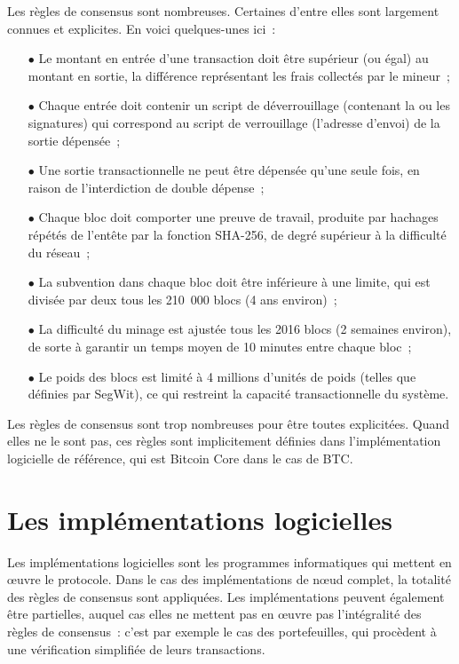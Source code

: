 Les règles de consensus sont nombreuses. Certaines d'entre elles sont largement connues et explicites. En voici quelques-unes ici~:

\begin{itemize}
\item[$\bullet$] Le montant en entrée d'une transaction doit être supérieur (ou égal) au montant en sortie, la différence représentant les frais collectés par le mineur~;
\item[$\bullet$] Chaque entrée doit contenir un script de déverrouillage (contenant la ou les signatures) qui correspond au script de verrouillage (l'adresse d'envoi) de la sortie dépensée~;
\item[$\bullet$] Une sortie transactionnelle ne peut être dépensée qu'une seule fois, en raison de l'interdiction de double dépense~;
\item[$\bullet$] Chaque bloc doit comporter une preuve de travail, produite par hachages répétés de l'entête par la fonction SHA-256, de degré supérieur à la difficulté du réseau~;
\item[$\bullet$] La subvention dans chaque bloc doit être inférieure à une limite, qui est divisée par deux tous les 210~000 blocs (4 ans environ)~;
\item[$\bullet$] La difficulté du minage est ajustée tous les 2016 blocs (2 semaines environ), de sorte à garantir un temps moyen de 10 minutes entre chaque bloc~;
\item[$\bullet$] Le poids des blocs est limité à 4 millions d'unités de poids (telles que définies par SegWit), ce qui restreint la capacité transactionnelle du système.
\end{itemize}

Les règles de consensus sont trop nombreuses pour être toutes explicitées. Quand elles ne le sont pas, ces règles sont implicitement définies dans l'implémentation logicielle de référence, qui est Bitcoin Core dans le cas de BTC.

\section*{Les implémentations logicielles}


Les implémentations logicielles sont les programmes informatiques qui mettent en œuvre le protocole. Dans le cas des implémentations de nœud complet, la totalité des règles de consensus sont appliquées. Les implémentations peuvent également être partielles, auquel cas elles ne mettent pas en œuvre pas l'intégralité des règles de consensus~: c'est par exemple le cas des portefeuilles, qui procèdent à une vérification simplifiée de leurs transactions.

